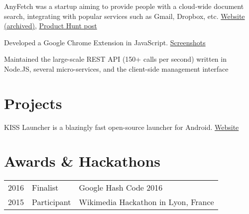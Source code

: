 \documentclass[
  english,
  a4paper
]{resume-openfont}
\begin{document}
\begin{minipage}[t]{0.66\textwidth}
%
%
AnyFetch was a startup aiming to provide people with a cloud-wide document search, integrating with popular services such as Gmail, Dropbox, etc. \href{https://i.imgur.com/B3MMD6Y.png}{Website (archived)}, \href{https://www.producthunt.com/posts/anyfetch}{Product Hunt post}
\vspace{\topsep}
\begin{tightemize}
\item Developed a Google Chrome Extension in JavaScript. \href{https://i.imgur.com/yql5v1z.png}{Screenshots}
\item Maintained the large-scale REST API (150+ calls per second) written in Node.JS, several micro-services, and the client-side management interface
\end{tightemize}


\section{Projects}
%
%
KISS Launcher is a blazingly fast open-source launcher for Android. \href{http://kisslauncher.com/}{Website}
\sectionsep


\section{Awards \& Hackathons}
\begin{tabular}{@{}rll}
2016       & Finalist    & Google Hash Code 2016\\
2015	     & Participant & Wikimedia Hackathon in Lyon, France
\end{tabular}
\sectionsep

\end{minipage}
\end{document}
